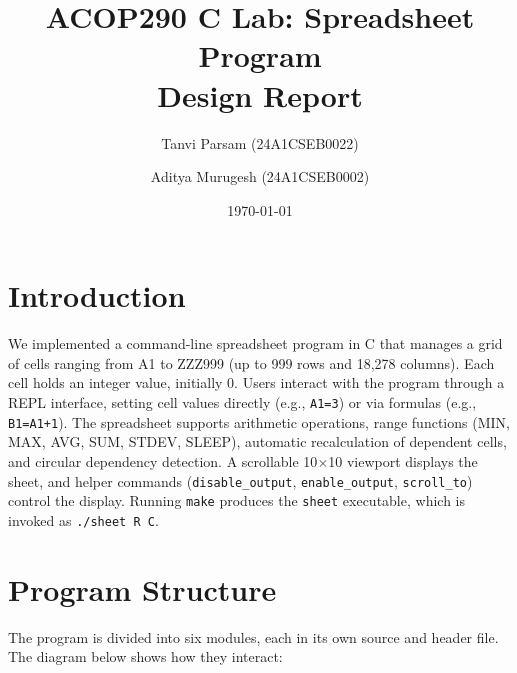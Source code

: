 \documentclass[11pt,a4paper]{article}
\title{ACOP290 C Lab: Spreadsheet Program \\ \large Design Report}
\author{
    Tanvi Parsam (24A1CSEB0022) \and Aditya Murugesh (24A1CSEB0002)
}
\date{\today}
\begin{document}
\maketitle

\section{Introduction}

We implemented a command-line spreadsheet program in C that manages a grid of cells ranging from A1 to ZZZ999 (up to 999 rows and 18,278 columns). Each cell holds an integer value, initially 0. Users interact with the program through a REPL interface, setting cell values directly (e.g., \texttt{A1=3}) or via formulas (e.g., \texttt{B1=A1+1}). The spreadsheet supports arithmetic operations, range functions (MIN, MAX, AVG, SUM, STDEV, SLEEP), automatic recalculation of dependent cells, and circular dependency detection. A scrollable 10$\times$10 viewport displays the sheet, and helper commands (\texttt{disable\_output}, \texttt{enable\_output}, \texttt{scroll\_to}) control the display. Running \texttt{make} produces the \texttt{sheet} executable, which is invoked as \texttt{./sheet R C}.

\section{Program Structure}

The program is divided into six modules, each in its own source and header file. The diagram below shows how they interact:
\end{document}
